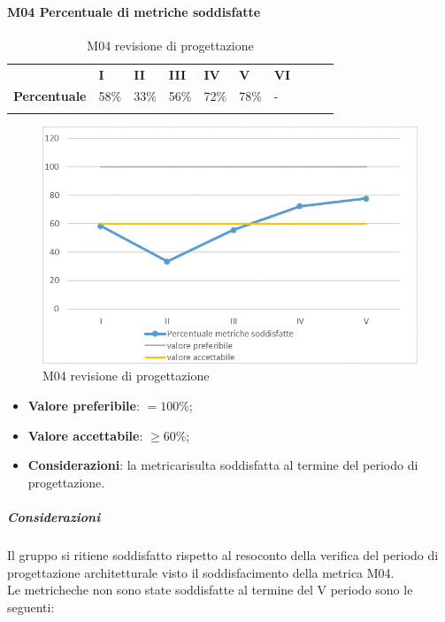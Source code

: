 \paragraph{M04 Percentuale di metriche soddisfatte} \mbox{}
\begin{longtable}[H!] {						
		>{}p{50mm}  		
		>{}p{8mm}
		>{}p{8mm}		
		>{}p{8mm}		
		>{}p{8mm}		
		>{}p{8mm}		
		>{}p{8mm}
		>{}p{8mm}
		>{}p{8mm}
		>{}p{8mm}
	}
	\rowcolor{gray!50}
	\textbf{} & \textbf{I} & \textbf{II} & \textbf{III} & \textbf{IV} & \textbf{V} & \textbf{VI} \TBstrut \\ [2mm]
	\textbf{Percentuale} & 58\% & 33\% & 56\% & 72\% & 78\% & - \TBstrut \\ [2mm]
	\rowcolor{white}
	\caption{M04 revisione di progettazione\glo}
\end{longtable}
\begin{figure}[H] 	
\includegraphics[width=\linewidth]{./img/grafici/RP19.png}	
\caption{M04 revisione di progettazione\glo}	
\end{figure}
\begin{itemize}
	\item \textbf{Valore preferibile}: $=100\%$;
	\item \textbf{Valore accettabile}: $\ge60\%$;
	\item \textbf{Considerazioni}: la metrica\glosp risulta soddisfatta al termine del periodo di progettazione\glo.
\end{itemize}
\subparagraph{Considerazioni}
Il gruppo si ritiene soddisfatto rispetto al resoconto della verifica del periodo di progettazione architetturale visto il soddisfacimento della metrica M04. \\
Le metriche\glosp che non sono state soddisfatte al termine del V periodo sono le seguenti:
